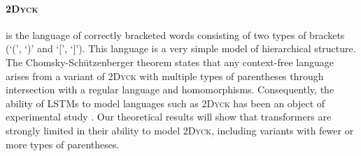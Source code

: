 \documentclass[11pt,a4paper]{article}
\newcounter{theorem}
\begin{document}
%
%


\paragraph{\textsc{2Dyck}} is the language of correctly bracketed words consisting of two types of brackets (`(', `)' and `[', `]').
This language is a very simple model of hierarchical structure.
The Chomsky-Sch{\"u}tzenberger theorem \cite{chomsky1963algebraic} states that any context-free language arises from a variant of \textsc{2Dyck} with multiple types of parentheses through intersection with a regular language and homomorphisms.
Consequently, the ability of LSTMs to model languages such as \textsc{2Dyck} has been an object of experimental study \cite{sennhauser2018evaluating,skachkova2018closing,bernardy2018can}.
Our theoretical results will show that transformers are strongly limited in their ability to model \textsc{2Dyck}, including variants with fewer or more types of parentheses.



\end{document}

